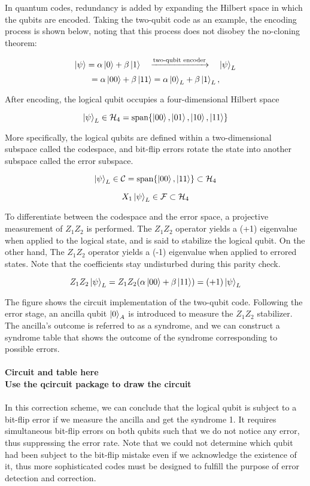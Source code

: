 \documentclass[final,5p,times,twocolumn,authoryear]{elsarticle}
\begin{document}
In quantum codes, redundancy is added by expanding the Hilbert space in which the qubits are encoded. Taking the two-qubit code as an example, the encoding process is shown below, noting that this process does not disobey the no-cloning theorem:

\[
    \ket{\psi} = \alpha \ket{0} + \beta \ket{1}
    \quad
    \xrightarrow{\text{two-qubit encoder}}
    \quad
    \ket{\psi}_L
\]
\[
    = \alpha \ket{00} + \beta \ket{11} = \alpha \ket{0}_L + \beta \ket{1}_L,
\]

After encoding, the logical qubit occupies a four-dimensional Hilbert space

\[
    \ket{\psi}_L \in \mathcal{H}_4 = \text{span}\{\ket{00}, \ket{01}, \ket{10}, \ket{11}\}
\]

More specifically, the logical qubits are defined within a two-dimensional subspace called the codespace, and bit-flip errors rotate the state into another subspace called the error subspace.

\[
    \ket{\psi}_L \in \mathcal{C} = \text{span}\{\ket{00}, \ket{11}\} \subset \mathcal{H}_4
\]

\[
    X_1 \ket{\psi}_L \in \mathcal{F} \subset \mathcal{H}_4
\]

To differentiate between the codespace and the error space, a projective measurement of $Z_1Z_2$ is performed. The $Z_1Z_2$ operator yields a (+1) eigenvalue when applied to the logical state, and is said to stabilize the logical qubit. On the other hand, The $Z_1Z_2$ operator yields a (-1) eigenvalue when applied to errored states. Note that the coefficients stay undisturbed during this parity check.

\[
    Z_1Z_2\ket{\psi}_L = Z_1Z_2(\alpha \ket{00} + \beta \ket{11}) = (+1) \ket{\psi}_L
\]

The figure shows the circuit implementation of the two-qubit code. Following the error stage, an ancilla qubit $\ket{0}_A$ is introduced to measure the $Z_1Z_2$ stabilizer. The ancilla's outcome is referred to as a syndrome, and we can construct a syndrome table that shows the outcome of the syndrome corresponding to possible errors.
\\
\\
\textbf{Circuit and table here}
\\
\textbf{Use the qcircuit package to draw the circuit}
\\
\\
In this correction scheme, we can conclude that the logical qubit is subject to a bit-flip error if we measure the ancilla and get the syndrome 1. It requires simultaneous bit-flip errors on both qubits such that we do not notice any error, thus suppressing the error rate. Note that we could not determine which qubit had been subject to the bit-flip mistake even if we acknowledge the existence of it, thus more sophisticated codes must be designed to fulfill the purpose of error detection and correction.
\end{document}
